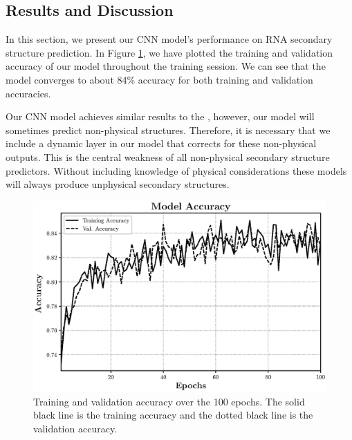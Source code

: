 \documentclass[11pt]{article}
\begin{document}
\begin{multicols}{2}
\subsection{Results and Discussion}
In this section, we present our CNN model's performance on RNA secondary structure prediction. In Figure \ref{fig:acc}, we have plotted the training and validation accuracy of our model throughout the training session. We can see that the model converges to about 84\% accuracy for both training and validation accuracies.

Our CNN model achieves similar results to the \cite{10.3389/fgene.2019.00467}, however, our model will sometimes predict non-physical structures. Therefore, it is necessary that we include a dynamic layer in our model that corrects for these non-physical outputs. This is the central weakness of all non-physical secondary structure predictors. Without including knowledge of physical considerations these models will always produce unphysical secondary structures.

\end{multicols}
\begin{figure}[H]
\centering
\includegraphics[width = \textwidth]{fig/acc}
\caption{Training and validation accuracy over the 100 epochs. The solid black line is the training accuracy and the dotted black line is the validation accuracy.}
\label{fig:acc}
\end{figure}
\end{document}
